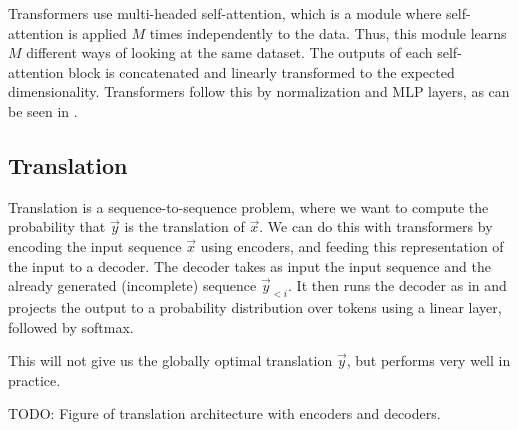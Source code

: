 Transformers \citep{vaswani2017attention} use multi-headed self-attention,
which is a module where self-attention is applied $M$ times independently to
the data. Thus, this module learns $M$ different ways of looking at the same
dataset. The outputs of each self-attention block is concatenated and linearly
transformed to the expected dimensionality. Transformers follow this by
normalization and MLP layers, as can be seen in .

\subsection{Translation}

Translation is a sequence-to-sequence problem, where we want to compute the
probability that $\vec{y}$ is the translation of $\vec{x}$. We can do this with
transformers by encoding the input sequence $\vec{x}$ using encoders, and
feeding this representation of the input to a decoder. The decoder takes as
input the input sequence and the already generated (incomplete) sequence
$\vec{y}_{<i}$. It then runs the decoder as in  and
projects the output to a probability distribution over tokens using a linear
layer, followed by softmax.

This will not give us the globally optimal translation $\vec{y}$, but performs
very well in practice.

TODO: Figure of translation architecture with encoders and decoders.
